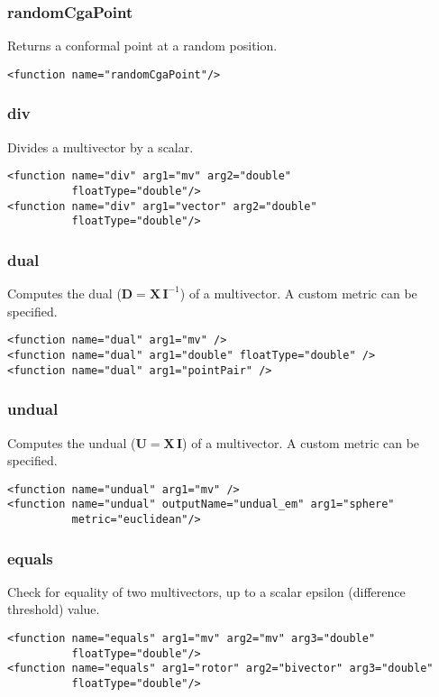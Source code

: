 \documentclass[10pt, a4paper]{article}
\newcommand{\gav}[1]{\ensuremath{\mathbf{#1}}}
\newcommand{\gp}{\,}
\newcommand{\inv}[1]{{#1}^{-1}}
\begin{document}
\subsubsection*{randomCgaPoint}

Returns a conformal point at a random position.
\begin{verbatim}
<function name="randomCgaPoint"/>
\end{verbatim}

\subsubsection*{div}

Divides a multivector by a scalar.
\begin{verbatim}
<function name="div" arg1="mv" arg2="double" 
          floatType="double"/>
<function name="div" arg1="vector" arg2="double" 
          floatType="double"/>
\end{verbatim}

\subsubsection*{dual}

Computes the dual ($\gav{D} = \gav{X} \gp \inv{\gav{I}}$) of a multivector. A custom metric can be specified.
\begin{verbatim}
<function name="dual" arg1="mv" />
<function name="dual" arg1="double" floatType="double" />
<function name="dual" arg1="pointPair" />
\end{verbatim}

\subsubsection*{undual}

Computes the undual ($\gav{U} = \gav{X} \gp \gav{I}$) of a multivector. A custom metric can be specified.
\begin{verbatim}
<function name="undual" arg1="mv" />
<function name="undual" outputName="undual_em" arg1="sphere" 
          metric="euclidean"/>
\end{verbatim}

\subsubsection*{equals}

Check for equality of two multivectors, up to a scalar epsilon (difference threshold) value.
\begin{verbatim}
<function name="equals" arg1="mv" arg2="mv" arg3="double" 
          floatType="double"/>
<function name="equals" arg1="rotor" arg2="bivector" arg3="double" 
          floatType="double"/>
\end{verbatim}
\end{document}
